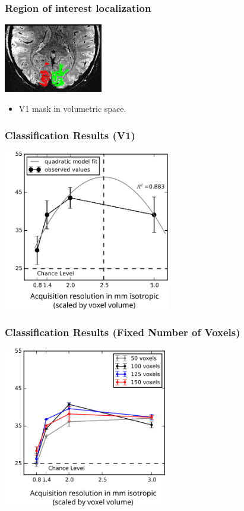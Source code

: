 \documentclass{beamer}
\begin{document}
  \begin{frame}
    \frametitle{Region of interest localization}
        \begin{center}
            \includegraphics[height=3cm]{../pictures/ROI}
        \end{center}
                \begin{itemize}
         \item V1 mask in volumetric space.
        \end{itemize} 
    \end{frame} 
    
  \begin{frame}
    \frametitle{Classification Results (V1)}
        \begin{center}
            \includegraphics[height=7cm]{../pictures/classification}
        \end{center}
    \end{frame}

  \begin{frame}
    \frametitle{Classification Results (Fixed Number of Voxels)}
        \begin{center}
            \includegraphics[height=7cm]{../pictures/fixed_voxels}
        \end{center}
    \end{frame}    
\end{document}
